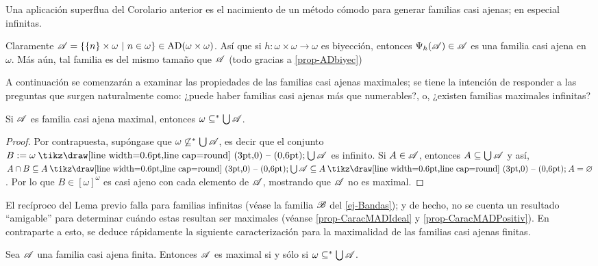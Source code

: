 	Una aplicación superflua del Corolario anterior es el nacimiento de un método cómodo para generar familias casi ajenas; en especial infinitas.
	
	\begin{ejemplo}
		\label{ej-Bandas}
		Claramente $\mathscr{A}=\{ \{n\} \times \omega \text{ $|$ } n \in \omega \} \in \operatorname{AD}(\omega \times \omega)$. Así que si $h:\omega \times \omega \to \omega$ es biyección, entonces $\Psi_h(\mathscr{A}) \in \mathscr{A}$ es una familia casi ajena en $\omega$. Más aún, tal familia es del mismo tamaño que $\mathscr{A}$ (todo gracias a \ref{prop-ADbiyec})
	\end{ejemplo}
	
	A continuación se comenzarán a examinar las propiedades de las familias casi ajenas maximales; se tiene la intención de responder a las preguntas que surgen naturalmente como: ¿puede haber familias casi ajenas más que numerables?, o, ¿existen familias maximales infinitas?
	
	\begin{lema}\label{lem-MADnecesarioUnion}
		Si $\mathscr{A}$ es familia casi ajena maximal, entonces $\omega \subseteq^* \mbox{$\bigcup$}\, \mathscr{A}$.
	\end{lema}
	
	\begin{proof}
		Por contrapuesta, supóngase que $\omega \not\subseteq^* \mbox{$\bigcup$}\, \mathscr{A}$, es decir que el conjunto $B:=\omega \setminus \midcup \ms{A}$ es infinito. Si $A \in \mathscr{A}$, entonces $A \subseteq \mbox{$\bigcup$}\, \mathscr{A}$ y así, $A \cap B \subseteq A \setminus \midcup \ms{A} \subseteq A \setminus A = \emptyset$. Por lo que $B \in [\omega]^\omega$ es casi ajeno con cada elemento de $\mathscr{A}$, mostrando que $\mathscr{A}$ no es maximal. 
	\end{proof}
	
	El recíproco del Lema previo falla para familias infinitas (véase la familia $\mathscr{B}$ del \autoref{ej-Bandas}); y de hecho, no se cuenta un resultado ``amigable'' para determinar cuándo estas resultan ser maximales (véanse \ref{prop-CaracMADIdeal} y \ref{prop-CaracMADPositiv}). En contraparte a esto, se deduce rápidamente la siguiente caracterización para la maximalidad de las familias casi ajenas finitas.
	
	\begin{corolario}\label{cor-MADnecesarioUnion}
		Sea $\mathscr{A}$ una familia casi ajena finita. Entonces $\mathscr{A}$ es maximal si y sólo si $\omega \subseteq^* \mbox{$\bigcup$}\, \mathscr{A}$.
	\end{corolario}
	
